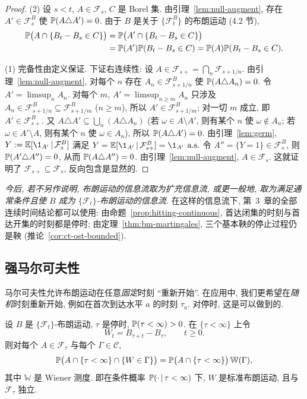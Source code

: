 \begin{proof}
(2) 设 $s<t$, $A\in\mathcal{F}_s$, $C$ 是 Borel 集. 由引理~\ref{lem:null-augment}, 存在 $A'\in\mathcal{F}^B_s$ 使 $\P(A\triangle A')=0$. 由于 $B$ 是关于 $\{\mathcal{F}^B_t\}$ 的布朗运动 (4.2 节),
\begin{align*}
\P\big(A\cap\{B_t-B_s\in C\}\big)&=\P\big(A'\cap\{B_t-B_s\in C\}\big)\\
&=\P(A')\P(B_t-B_s\in C)=\P(A)\P(B_t-B_s\in C).
\end{align*}

(1) 完备性由定义保证. 下证右连续性: 设 $A\in\mathcal{F}_{s+}=\bigcap_{n}\mathcal{F}_{s+1/n}$. 由引理~\ref{lem:null-augment}, 对每个 $n$ 存在 $A_n\in\mathcal{F}^B_{s+1/n}$ 使 $\P(A\triangle A_n)=0$. 令 $A'=\limsup_nA_n$. 对每个 $m$, $A'=\limsup_{n\ge m}A_n$ 只涉及 $A_n\in\mathcal{F}^B_{s+1/n}\subseteq\mathcal{F}^B_{s+1/m}$ ($n\ge m$), 所以 $A'\in\mathcal{F}^B_{s+1/m}$; 对一切 $m$ 成立, 即 $A'\in\mathcal{F}^B_{s+}$. 又 $A\triangle A'\subseteq\bigcup_n(A\triangle A_n)$ (若 $\omega\in A\setminus A'$, 则有某个 $n$ 使 $\omega\notin A_n$; 若 $\omega\in A'\setminus A$, 则有某个 $n$ 使 $\omega\in A_n$), 所以 $\P(A\triangle A')=0$. 由引理~\ref{lem:germ}, $Y:=\E[\1_{A'}\,|\,\mathcal{F}^B_s]$ 满足 $Y=\E[\1_{A'}\,|\,\mathcal{F}^B_{s+}]=\1_{A'}$ $\as$ 令 $A''=\{Y=1\}\in\mathcal{F}^B_s$, 则 $\P(A'\triangle A'')=0$, 从而 $\P(A\triangle A'')=0$. 由引理~\ref{lem:null-augment}, $A\in\mathcal{F}_s$. 这就证明了 $\mathcal{F}_{s+}\subseteq\mathcal{F}_s$, 反向包含是显然的.
\end{proof}

\emph{今后, 若不另作说明, 布朗运动的信息流取为扩充信息流, 或更一般地, 取为满足通常条件且使 $B$ 成为 $\{\mathcal{F}_t\}$-布朗运动的信息流.} 在这样的信息流下, 第~3~章的全部连续时间结论都可以使用: 由命题~\ref{prop:hitting-continuous}, 首达闭集的时刻与首达开集的时刻都是停时; 由定理~\ref{thm:bm-martingales}, 三个基本鞅的停止过程仍是鞅 (推论~\ref{cor:ct-ost-bounded}).

\subsection{强马尔可夫性}

马尔可夫性允许布朗运动在任意\emph{固定}时刻 ``重新开始''. 在应用中, 我们更希望在\emph{随机}时刻重新开始, 例如在首次到达水平 $a$ 的时刻 $\tau_a$. 对停时, 这是可以做到的.

\begin{theorem}[强马尔可夫性]\label{thm:strong-markov}
设 $B$ 是 $\{\mathcal{F}_t\}$-布朗运动, $\tau$ 是停时, $\P(\tau<\infty)>0$. 在 $\{\tau<\infty\}$ 上令
\[
W_t=B_{\tau+t}-B_\tau,\qquad t\ge0.
\]
则对每个 $A\in\mathcal{F}_\tau$ 与每个 $\Gamma\in\mathcal{C}$,
\begin{equation}\label{eq:strong-markov}
\P\big(A\cap\{\tau<\infty\}\cap\{W\in\Gamma\}\big)=\P\big(A\cap\{\tau<\infty\}\big)\,\mathbb{W}(\Gamma),
\end{equation}
其中 $\mathbb{W}$ 是 Wiener 测度. 即在条件概率 $\P(\cdot\,|\,\tau<\infty)$ 下, $W$ 是标准布朗运动, 且与 $\mathcal{F}_\tau$ 独立.
\end{theorem}

